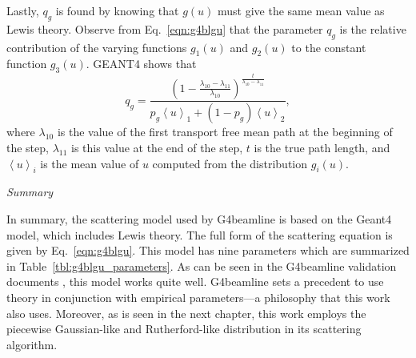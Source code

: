 Lastly, $q_g$ is found by knowing that $g(u)$ must give the same mean value as Lewis theory. Observe from Eq.~\eqref{eqn:g4blgu} that the parameter $q_g$ is the relative contribution of the varying functions $g_1(u)$ and $g_2(u)$ to the constant function $g_3(u)$. GEANT4 \cite{geant4} shows that
%
\begin{equation}
q_g=\frac{(1-\frac{\lambda_{10}-\lambda_{11}}{\lambda_{10}})^{\frac{t}{\lambda_{10}-\lambda_{11}}}}{p_g\left<u\right>_1+(1-p_g)\left<u\right>_2},
\label{eqn:geantq}
\end{equation}
where $\lambda_{10}$ is the value of the first transport free mean path at the beginning of the step, $\lambda_{11}$ is this value at the end of the step, $t$ is the true path length, and $\left<u\right>_i$ is the mean value of $u$ computed from the distribution $g_i(u)$.

\noindent \textit{\large{Summary}}

In summary, the scattering model used by G4beamline is based on the Geant4 model, which includes Lewis theory. The full form of the scattering equation is given by Eq.~\eqref{eqn:g4blgu}. This model has nine parameters which are summarized in Table~\ref{tbl:g4blgu_parameters}. As can be seen in the G4beamline validation documents \cite{g4bl}, this model works quite well. G4beamline sets a precedent to use theory in conjunction with empirical parameters---a philosophy that this work also uses. Moreover, as is seen in the next chapter, this work employs the piecewise Gaussian-like and Rutherford-like distribution in its scattering algorithm.